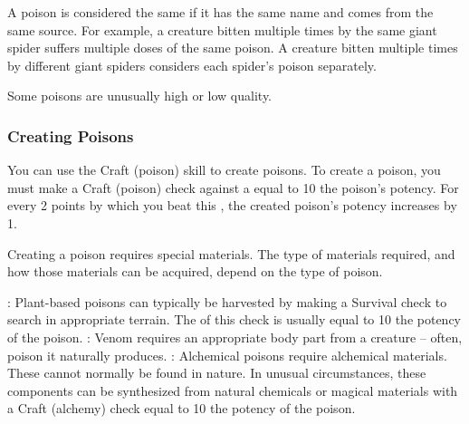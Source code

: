             A poison is considered the same if it has the same name and comes from the same source.
            For example, a creature bitten multiple times by the same giant spider suffers multiple doses of the same poison.
            A creature bitten multiple times by different giant spiders considers each spider's poison separately.

             Some poisons are unusually high or low quality.

        \subsubsection{Creating Poisons}\label{Creating Poisons}

            You can use the Craft (poison) skill to create poisons.
            To create a poison, you must make a Craft (poison) check against a  equal to 10 \add the poison's potency.
            For every 2 points by which you beat this , the created poison's potency increases by 1.

            Creating a poison requires special materials.
            The type of materials required, and how those materials can be acquired, depend on the type of poison.

            \begin{itemize}
                : Plant-based poisons can typically be harvested by making a Survival check to search in appropriate terrain.
                    The  of this check is usually equal to 10 \add the potency of the poison.
                : Venom requires an appropriate body part from a creature -- often, poison it naturally produces.
                : Alchemical poisons require alchemical materials.
                    These cannot normally be found in nature.
                    In unusual circumstances, these components can be synthesized from natural chemicals or magical materials with a Craft (alchemy) check equal to 10 \add the potency of the poison.
            \end{itemize}
